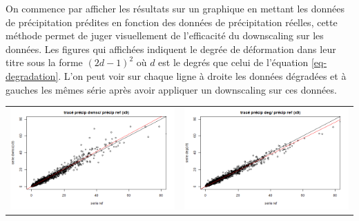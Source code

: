 \documentclass[a4paper,10pt]{article}
\begin{document}
On commence par afficher les résultats sur un graphique en mettant les données de précipitation prédites en fonction des données de précipitation réelles, cette méthode permet de juger visuellement de l'efficacité du downscaling sur les données. Les figures qui affichées indiquent le degrée de déformation dans leur titre sous la forme $(2d-1)^2$ où $d$ est le degrés que celui de l'équation \eqref{eq-degradation}. L'on peut voir sur chaque ligne à droite les données dégradées et à gauches les mêmes série après avoir appliquer un downscaling sur ces données.

\hspace{-1cm}
\begin{tabular}{cc} 
	\includegraphics[scale=0.4]{images/pr_1_ds.png} & \includegraphics[scale=0.4]{images/pr_1_dg.png}  \\ 

\end{tabular}
\end{document}
